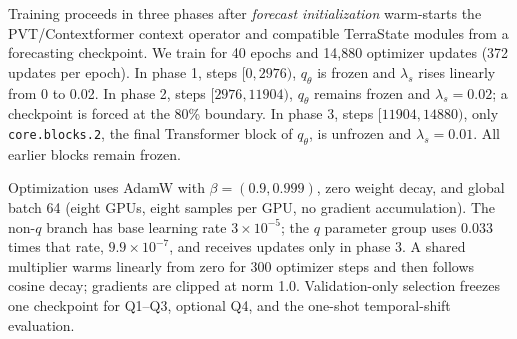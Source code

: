 \documentclass[letterpaper]{article} %
\begin{document}
Training proceeds in three phases after \emph{forecast initialization}
warm-starts the PVT/Contextformer context operator and compatible TerraState
modules from a forecasting checkpoint. We train for 40 epochs and 14,880
optimizer updates
(372 updates per epoch). In phase 1, steps $[0,2976)$, $q_\theta$ is frozen and
$\lambda_s$ rises linearly from 0 to 0.02. In phase 2, steps
$[2976,11904)$, $q_\theta$ remains frozen and $\lambda_s=0.02$; a checkpoint is
forced at the 80\% boundary. In phase 3, steps $[11904,14880)$, only
\texttt{core.blocks.2}, the final Transformer block of $q_\theta$, is
unfrozen and $\lambda_s=0.01$. All earlier blocks remain frozen.

Optimization uses AdamW with $\beta=(0.9,0.999)$, zero weight decay, and
global batch 64 (eight GPUs, eight samples per GPU, no gradient accumulation).
The non-$q$ branch has base learning rate $3\times10^{-5}$; the $q$ parameter
group uses $0.033$ times that rate, $9.9\times10^{-7}$, and receives updates
only in phase 3. A shared multiplier warms linearly from zero for 300 optimizer
steps and then follows cosine decay; gradients are clipped at norm 1.0.
Validation-only selection freezes one checkpoint for Q1--Q3, optional Q4, and
the one-shot temporal-shift evaluation.
\end{document}
